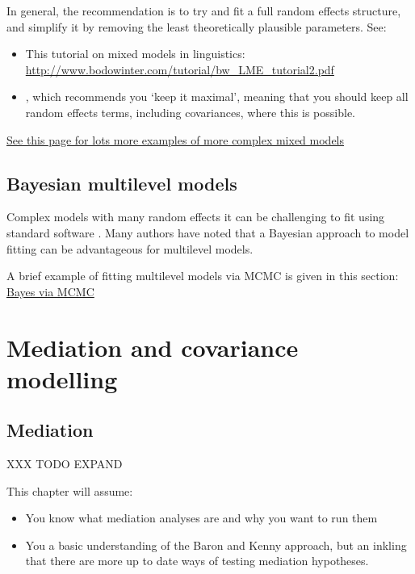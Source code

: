 \documentclass[]{article}
\providecommand{\tightlist}{%
  \setlength{\itemsep}{0pt}\setlength{\parskip}{0pt}}
\theoremstyle{definition}
\theoremstyle{definition}
\theoremstyle{definition}
\theoremstyle{remark}
\begin{document}
In general, the recommendation is to try and fit a full random effects
structure, and simplify it by removing the least theoretically plausible
parameters. See:

\begin{itemize}
\item
  This tutorial on mixed models in linguistics:
  \url{http://www.bodowinter.com/tutorial/bw_LME_tutorial2.pdf}
\item
  \citet{barr2013random}, which recommends you `keep it maximal',
  meaning that you should keep all random effects terms, including
  covariances, where this is possible.
\end{itemize}

\href{http://rpsychologist.com/r-guide-longitudinal-lme-lmer}{See this
page for lots more examples of more complex mixed models}

\subsection*{Bayesian multilevel models}\label{multilevel-bayes-reasons}

Complex models with many random effects it can be challenging to fit
using standard software \citep[see eager2017mixed
and][]{gelman2014bayesian}. Many authors have noted that a Bayesian
approach to model fitting can be advantageous for multilevel models.

A brief example of fitting multilevel models via MCMC is given in this
section: \protect\hyperlink{bayes-mcmc}{Bayes via MCMC}

\section{Mediation and covariance
modelling}\label{mediation-and-covariance-modelling}

\hypertarget{mediation}{\subsection*{Mediation}\label{mediation}}

XXX TODO EXPAND

This chapter will assume:

\begin{itemize}
\tightlist
\item
  You know what mediation analyses are and why you want to run them
\item
  You a basic understanding of the Baron and Kenny approach, but an
  inkling that there are more up to date ways of testing mediation
  hypotheses.
\end{itemize}
\end{document}
